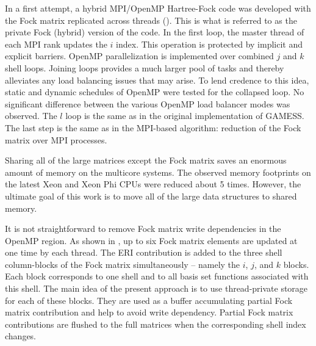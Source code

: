 In a first attempt, a hybrid MPI/OpenMP Hartree-Fock code was developed with the Fock matrix replicated across threads (\mbox{}). This is what is referred to as the private Fock (hybrid) version of the code. In the first loop, the master thread of each MPI rank updates the $i$ index. This operation is protected by implicit and explicit barriers. OpenMP parallelization is implemented over combined $j$ and $k$ shell loops. Joining loops provides a much larger pool of tasks and thereby alleviates any load balancing issues that may arise. To lend credence to this idea, static and dynamic schedules of OpenMP were tested for the collapsed loop. No significant difference between the various OpenMP load balancer modes was observed. The $l$ loop is the same as in the original implementation of GAMESS. The last step is the same as in the MPI-based algorithm: reduction of the Fock matrix over MPI processes.

Sharing all of the large matrices except the Fock matrix saves an enormous amount of memory on the multicore systems. The observed memory footprints on the latest Xeon and Xeon Phi CPUs were reduced about 5 times. However, the ultimate goal of this work is to move all of the large data structures to shared memory.

It is not straightforward to remove Fock matrix write dependencies in the OpenMP region. As shown in , up to six Fock matrix elements are updated at one time by each thread. The ERI contribution is added to the three shell column-blocks of the Fock matrix simultaneously -- namely the $i$, $j$, and $k$ blocks. Each block corresponds to one shell and to all basis set functions associated with this shell. The main idea of the present approach is to use thread-private storage for each of these blocks. They are used as a buffer accumulating partial Fock matrix contribution and help to avoid write dependency. Partial Fock matrix contributions are flushed to the full matrices when the corresponding shell index changes.

